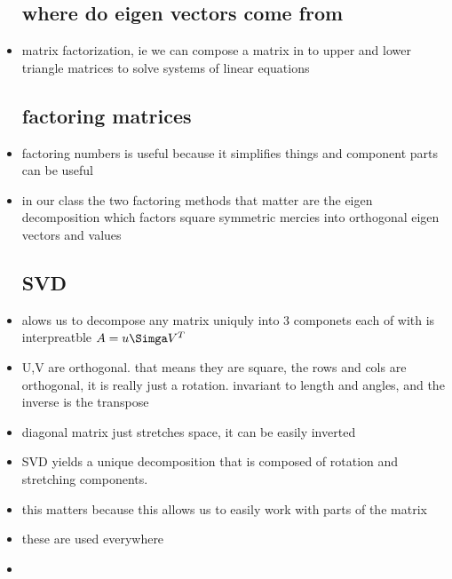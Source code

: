 \documentclass{article}
\begin{document}
\begin{itemize}
\subsection{where do eigen vectors come from}
    \item matrix factorization, ie we can compose a matrix in to upper and lower triangle matrices to solve systems of linear equations 
\subsection{factoring matrices}
\item factoring numbers is useful because it simplifies things and component parts can be useful
\item in our class the two factoring methods that matter are the eigen decomposition which factors square symmetric mercies into orthogonal eigen vectors and values 
\subsection{SVD}
\item alows us to decompose any matrix uniquly into 3 componets each of with is interpreatble $A=u\Simga V^T$
\item U,V are orthogonal. that means they are square, the rows and cols are orthogonal, it is really just a rotation. invariant to length and angles, and the inverse is the transpose
\item diagonal matrix just stretches space, it can be easily inverted
\item SVD yields a unique decomposition that is composed of rotation and stretching components. 
\item this matters because this allows us to easily work with parts of the matrix
\item these are used everywhere 
\item 
\end{itemize}
\end{document}
